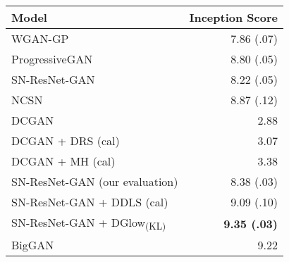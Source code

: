 \documentclass{article} \usepackage{iclr2021_conference,times}
\newcommand{\ourmethod}{\textsc{DG}low}
\begin{document}
\begin{table*}
	\footnotesize
	\caption{\small{Inception scores of different generative models, DRS, MH-GAN, DDLS, and \ourmethod{} on the CIFAR10 dataset. Higher scores are better.}}
	\label{tab:cifar-inception}
	\centering
	\begin{tabular}{lr} 
	\toprule
	\multirow{1}{*}{Model} & \multicolumn{1}{c}{Inception Score}\\
	\midrule
	WGAN-GP~\citep{gulrajani2017improved} & 7.86 (.07)\\
	ProgressiveGAN~\citep{karras2017progressive} & 8.80 (.05)\\
	SN-ResNet-GAN~\citep{miyato2018spectral} & 8.22 (.05)\\
	NCSN~\citep{song2019generative} & 8.87 (.12)\\
	\midrule
	DCGAN & 2.88\\
	DCGAN + DRS (cal)~\citep{azadi2018discriminator} & 3.07\\
	DCGAN + MH (cal)~\citep{turner2019metropolis} & 3.38\\
	\midrule
	SN-ResNet-GAN (our evaluation) & 8.38 (.03)\\
	SN-ResNet-GAN + DDLS (cal)~\citep{che2020your} & 9.09 (.10)\\
	SN-ResNet-GAN + \ourmethod{}\textsubscript{(KL)} & \textbf{9.35 (.03)}\\
	\midrule
	BigGAN & 9.22\\
	\bottomrule
	\end{tabular}
	\vspace{-.8em}
\end{table*}
\end{document}
